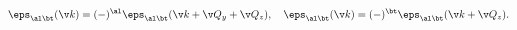 \begin{equation}
\label{3Depseps}
 \eps_{\al\bt}(\v k)= (-)^\al\eps_{\al\bt}(\v k+\v Q_y+\v Q_z),\ \ \
 \eps_{\al\bt}(\v k)= (-)^\bt\eps_{\al\bt}(\v k+\v Q_z).
\end{equation}

